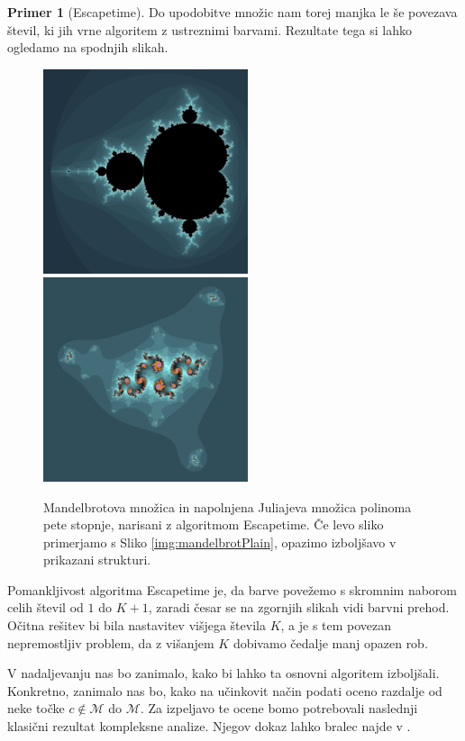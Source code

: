 \documentclass[12pt,a4paper]{amsart}
\theoremstyle{definition} %
\newtheorem{primer}[definicija]{Primer}
\theoremstyle{plain} %
\newcommand{\M}{\mathscr M} %
\begin{document}
\begin{primer}[Escapetime]
\noindent Do upodobitve množic nam torej manjka le še povezava števil, ki jih vrne algoritem z ustreznimi barvami.
Rezultate tega si lahko ogledamo na spodnjih slikah.

\begin{figure}[h]
\includegraphics[width=6cm]{graphics/mandelbrotEscapetime.png}
\includegraphics[width=6cm]{graphics/juliaEscapetime2.png}
\caption{
Mandelbrotova množica in napolnjena Juliajeva množica polinoma pete stopnje,
narisani z algoritmom Escapetime. 
Če levo sliko primerjamo s Sliko \ref{img:mandelbrotPlain}, opazimo izboljšavo v prikazani strukturi.
}
\label{img:Escapetime}
\end{figure}

Pomankljivost algoritma Escapetime je, da barve povežemo s skromnim naborom celih števil od $1$ do $K+1$,
zaradi česar se na zgornjih slikah vidi barvni prehod.
Očitna rešitev bi bila nastavitev višjega števila $K$, a je s tem povezan nepremostljiv problem,
da z višanjem $K$ dobivamo čedalje manj opazen rob.
\end{primer}
\vskip 2mm

V nadaljevanju nas bo zanimalo, kako bi lahko ta osnovni algoritem izboljšali. 
Konkretno, zanimalo nas bo, kako na učinkovit način podati oceno razdalje od neke točke $c \notin \M$ do $\M$.
Za izpeljavo te ocene bomo potrebovali naslednji klasični rezultat kompleksne analize. 
Njegov dokaz lahko bralec najde v \cite[Izrek~A.6.]{milnor}.
\end{document}
